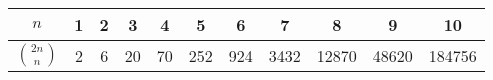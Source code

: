 \begin{center}
\begin{tabular}{c|c@{\ }c@{\ }c@{\ }c@{\ }c@{\ }c@{\ }c@{\ }c@{\ }c@{\ }c}
$n$            & 1 & 2 & 3 & 4  & 5   & 6   & 7    & 8     & 9     & 10\\
\hline
$\binom{2n}{n}$ & 2 & 6 & 20 & 70 & 252 & 924 & 3432 & 12870 & 48620 & 184756\\
\end{tabular}\\
\end{center}
